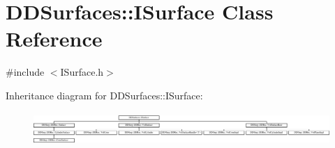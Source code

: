 \hypertarget{class_d_d_surfaces_1_1_i_surface}{}\section{D\+D\+Surfaces\+:\+:I\+Surface Class Reference}
\label{class_d_d_surfaces_1_1_i_surface}


{\ttfamily \#include $<$I\+Surface.\+h$>$}

Inheritance diagram for D\+D\+Surfaces\+:\+:I\+Surface\+:\begin{figure}[H]
\begin{center}
\leavevmode
\includegraphics[height=1.264822cm]{class_d_d_surfaces_1_1_i_surface}
\end{center}
\end{figure}
